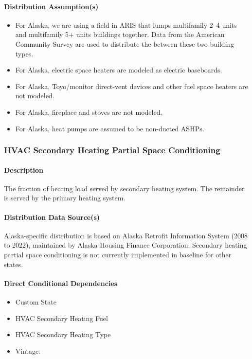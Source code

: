 \paragraph{Distribution Assumption(s)}
\begin{itemize}
    \item For Alaska, we are using a field in ARIS that lumps multifamily 2--4 units and multifamily 5+ units buildings together. Data from the American Community Survey are used to distribute the between these two building types.
    \item For Alaska, electric space heaters are modeled as electric baseboards.
    \item For Alaska, Toyo/monitor direct-vent devices and other fuel space heaters are not modeled.
    \item For Alaska, fireplace and stoves are not modeled.
    \item For Alaska, heat pumps are assumed to be non-ducted ASHPs.
\end{itemize}

\subsubsection{HVAC Secondary Heating Partial Space Conditioning}
\paragraph{Description}
The fraction of heating load served by secondary heating system. The remainder is served by the primary heating system.

\paragraph{Distribution Data Source(s)}
Alaska-specific distribution is based on Alaska Retrofit Information System (2008 to 2022), maintained by Alaska Housing Finance Corporation. Secondary heating partial space conditioning is not currently implemented in baseline for other states.

\paragraph{Direct Conditional Dependencies}
\begin{itemize}
    \item Custom State
    \item HVAC Secondary Heating Fuel
    \item HVAC Secondary Heating Type
    \item Vintage.
\end{itemize}


